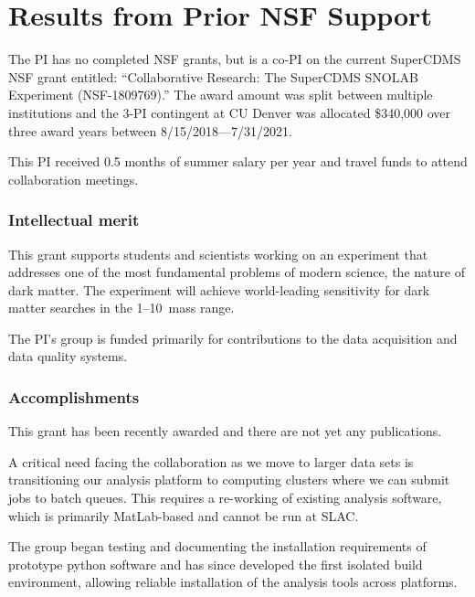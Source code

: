 
\section{Results from Prior NSF Support}
\label{sec:prev-res}

The PI has no completed NSF grants, but is a co-PI on the current SuperCDMS NSF grant entitled: ``Collaborative Research: The SuperCDMS SNOLAB Experiment (NSF-1809769).'' The award amount was split between multiple institutions and the 3-PI contingent at CU Denver was allocated \$340,000 over three award years between 8/15/2018—7/31/2021. 

This PI received 0.5 months of summer salary per year and travel funds to attend collaboration meetings.

\subsubsection{Intellectual merit} 
This grant supports students and scientists working on an experiment that addresses one of the most fundamental problems of modern science, the nature of dark matter. The \scs experiment will achieve world-leading sensitivity for dark matter searches in the 1--10~\gev mass range.

The PI's group is funded primarily for contributions to the data acquisition and data quality systems.


\subsubsection{Accomplishments}
This grant has been recently awarded and there are not yet any publications.

A critical need facing the collaboration as we move to larger data sets is transitioning our analysis platform to computing clusters where we can submit jobs to batch queues.  This requires a re-working of existing analysis software, which is primarily MatLab-based and cannot be run at SLAC.

The group began testing and documenting the installation requirements of prototype python software and has since developed the first isolated build environment, allowing reliable installation of the analysis tools across platforms.

